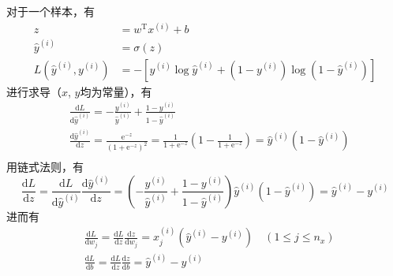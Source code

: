 \vspace{0.5\baselineskip}
对于一个样本，有
\begin{equation}
	\begin{aligned}
	z &= w^\mathrm{T} x^{(i)} + b \\
	\hat{y}^{(i)} &= \sigma(z) \\
	L(\hat{y}^{(i)}, y^{(i)}) &= -[y^{(i)} \log \hat{y}^{(i)} + (1 - y^{(i)}) \log (1 - \hat{y}^{(i)})]
	\end{aligned} 
	\label{eq:gradient_logistic_sample}
\end{equation}
进行求导（$x$, $y$均为常量），有
\begin{equation}
	\begin{aligned}
	&\frac{\mathrm{d}L}{\mathrm{d}\hat{y}^{(i)}} = -\frac{y^{(i)}}{\hat{y}^{(i)}} + \frac{1 - y^{(i)}}{1 - \hat{y}^{(i)}} \\
	&\frac{\mathrm{d}\hat{y}^{(i)}}{\mathrm{d}z} = \frac{\mathrm{e}^{-z}}{(1 + \mathrm{e}^{-z})^2} = \frac{1}{1 + \mathrm{e}^{-z}}(1 - \frac{1}{1 + \mathrm{e}^{-z}}) = \hat{y}^{(i)}(1 - \hat{y}^{(i)})\\
	\end{aligned}
\end{equation}
用链式法则，有
\begin{equation}
	\frac{\mathrm{d}L}{\mathrm{d}z} = \frac{\mathrm{d}L}{\mathrm{d}\hat{y}^{(i)}} \frac{\mathrm{d}\hat{y}^{(i)}}{\mathrm{d}z} = (-\frac{y^{(i)}}{\hat{y}^{(i)}} + \frac{1 - y^{(i)}}{1 - \hat{y}^{(i)}})\hat{y}^{(i)}(1 - \hat{y}^{(i)}) = \hat{y}^{(i)} - y^{(i)}
\end{equation}
进而有
\begin{equation}
	\begin{aligned}
	&\frac{\mathrm{d}L}{\mathrm{d}w_j} = \frac{\mathrm{d}L}{\mathrm{d}z} \frac{\mathrm{d}z}{\mathrm{d}w_j} = x_j^{(i)} (\hat{y}^{(i)} - y^{(i)}) \quad (1 \leqslant j \leqslant n_x) \\
	&\frac{\mathrm{d}L}{\mathrm{d}b} = \frac{\mathrm{d}L}{\mathrm{d}z} \frac{\mathrm{d}z}{\mathrm{d}b} = \hat{y}^{(i)} - y^{(i)}
	\end{aligned}
\end{equation}


